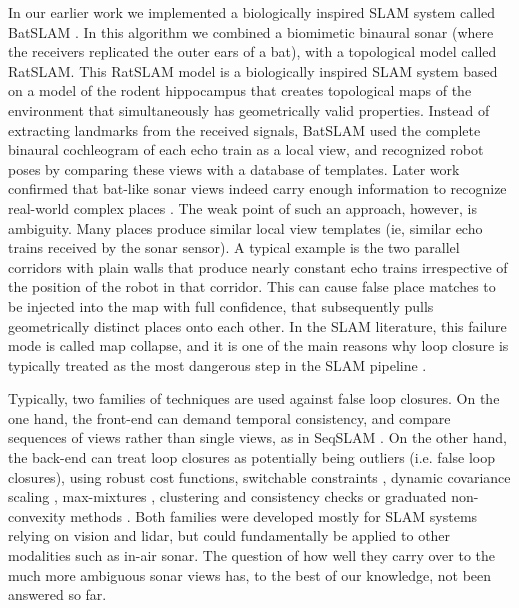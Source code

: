 \documentclass[journal]{IEEEtran}
\begin{document}
In our earlier work we implemented a biologically inspired SLAM system called BatSLAM \cite{steckelBatSLAMSimultaneousLocalization2013}. In this algorithm we combined a biomimetic binaural sonar (where the receivers replicated the outer ears of a bat), with a topological model called RatSLAM. This RatSLAM model is a biologically inspired SLAM system based on a model of the rodent hippocampus \cite{milfordRatSLAMHippocampalModel2004, milfordMappingSuburbSingle2008} that creates topological maps of the environment that simultaneously has geometrically valid properties. Instead of extracting landmarks from the received signals, BatSLAM used the complete binaural cochleogram of each echo train as a local view, and recognized robot poses by comparing these views with a database of templates. Later work confirmed that bat-like sonar views indeed carry enough information to recognize real-world complex places \cite{vanderelstPlaceRecognitionUsing2016}. The weak point of such an approach, however, is ambiguity. Many places produce similar local view templates (ie, similar echo trains received by the sonar sensor). A typical example is the two parallel corridors with plain walls that produce nearly constant echo trains irrespective of the position of the robot in that corridor. This can cause false place matches to be injected into the map with full confidence, that subsequently pulls geometrically distinct places onto each other. In the SLAM literature, this failure mode is called map collapse, and it is one of the main reasons why loop closure is typically treated as the most dangerous step in the SLAM pipeline \cite{cadenaPastPresentFuture2016, lowryVisualPlaceRecognition2016}.

Typically, two families of techniques are used against false loop closures. On the one hand, the front-end can demand temporal consistency, and compare sequences of views rather than single views, as in SeqSLAM \cite{milfordSeqSLAMVisualRoutebased2012}. On the other hand, the back-end can treat loop closures as potentially being outliers (i.e. false loop closures), using robust cost functions, switchable constraints \cite{sunderhaufSwitchableConstraintsRobust2012}, dynamic covariance scaling \cite{agarwalRobustMapOptimization2013}, max-mixtures \cite{olsonInferenceNetworksMixtures2013}, clustering and consistency checks \cite{latifRobustLoopClosing2013, mangelsonPairwiseConsistentMeasurement2018} or graduated non-convexity methods \cite{yangGraduatedNonConvexityRobust2020}. Both families were developed mostly for SLAM systems relying on vision and lidar, but could fundamentally be applied to other modalities such as in-air sonar. The question of how well they carry over to the much more ambiguous sonar views has, to the best of our knowledge, not been answered so far.
\end{document}
